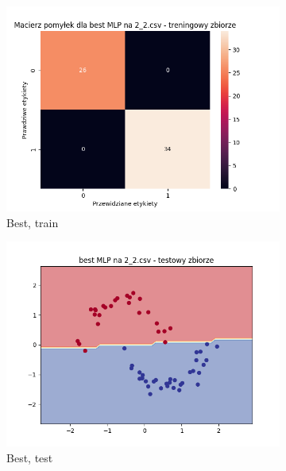 \documentclass[12pt]{article}
\newcommand*{\subfigwidth}{0.24\textwidth}
\begin{document}
\begin{figure}[H]
\begin{subfigure}[t]{\subfigwidth}
        \includegraphics[width=\linewidth]{img/exp_3/mlp/2_2/best/train_matrix.png}
        \caption{Best, train}
    \end{subfigure}
    \hfill
    \begin{subfigure}[t]{\subfigwidth}
        \includegraphics[width=\linewidth]{img/exp_3/mlp/2_2/best/test_boundary.png}
        \caption{Best, test}
    \end{subfigure}
    \hfill
    \begin{subfigure}[t]{\subfigwidth}

\end{subfigure}
\end{figure}
\end{document}
